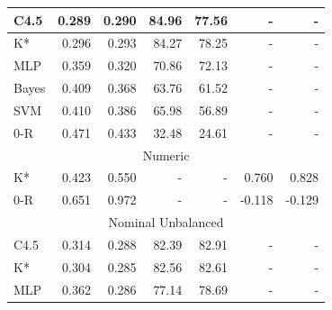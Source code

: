 \documentclass[../thesis/thesis.tex]{subfiles}
\begin{document}
\begin{table}
\begin{tabular}{|l|r|r|r|r|r|r|}
C4.5                & 0.289                                 & 0.290        & 84.96       & 77.56         & -           & -                                     \\ \hline
K*                  & 0.296                                 & 0.293        & 84.27       & 78.25         & -           & -                                     \\ \hline
MLP                 & 0.359                                 & 0.320        & 70.86       & 72.13         & -           & -                                     \\ \hline
Bayes               & 0.409                                 & 0.368        & 63.76       & 61.52         & -           & -                                     \\ \hline
SVM                 & 0.410                                 & 0.386        & 65.98       & 56.89         & -           & -                                     \\ \hline
0-R                 & 0.471                                 & 0.433        & 32.48       & 24.61         & -           & -                                     \\ \hline
\multicolumn{7}{|c|}{Numeric}                                                                                                                                  \\ \hline
K*                  & 0.423                                 & 0.550        & -           & -             & 0.760       & 0.828                                 \\ \hline
0-R                 & 0.651                                 & 0.972        & -           & -             & -0.118      & -0.129                                \\ \hline
\multicolumn{7}{|c|}{Nominal Unbalanced}                                                                                                                       \\ \hline
C4.5                & 0.314                                 & 0.288        & 82.39       & 82.91         & -           & -                                     \\ \hline
K*                  & 0.304                                 & 0.285        & 82.56       & 82.61         & -           & -                                     \\ \hline
MLP                 & 0.362                                 & 0.286        & 77.14       & 78.69         & -           & -                                     \\ \hline

\end{tabular}
\end{table}
\end{document}
